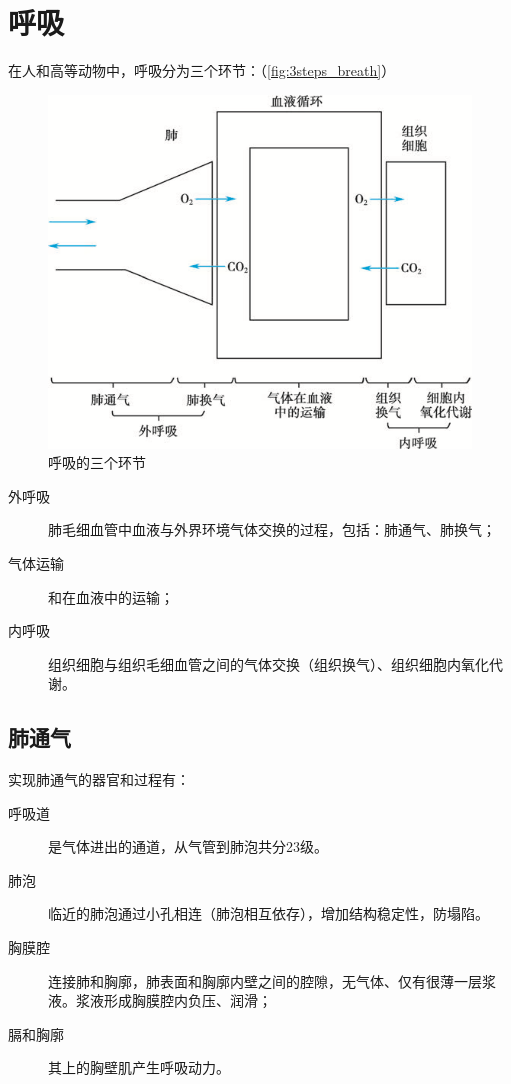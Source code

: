 \section{呼吸}

在人和高等动物中，呼吸分为三个环节：（\autoref{fig:3steps_breath}）
\begin{figure}[htbp]
	\centering
	\includegraphics[width=0.7\linewidth]{Pics/呼吸的三个环节}
	\caption{呼吸的三个环节}
	\label{fig:3steps_breath}
\end{figure}

\begin{description}
	\item[外呼吸] 肺毛细血管中血液与外界环境气体交换的过程，包括：肺通气、肺换气；
	\item[气体运输] 和在血液中的运输；
	\item[内呼吸] 组织细胞与组织毛细血管之间的气体交换（组织换气）、组织细胞内氧化代谢。
\end{description}

\subsection{肺通气}

实现肺通气的器官和过程有：
\begin{description}
	\item[呼吸道] 是气体进出的通道，从气管到肺泡共分23级。
	\item[肺泡] 临近的肺泡通过小孔相连（肺泡相互依存），增加结构稳定性，防塌陷。
	\item[胸膜腔] 连接肺和胸廓，肺表面和胸廓内壁之间的腔隙，无气体、仅有很薄一层浆液。浆液形成胸膜腔内负压、润滑；
	\item[膈和胸廓] 其上的胸壁肌产生呼吸动力。
\end{description}

